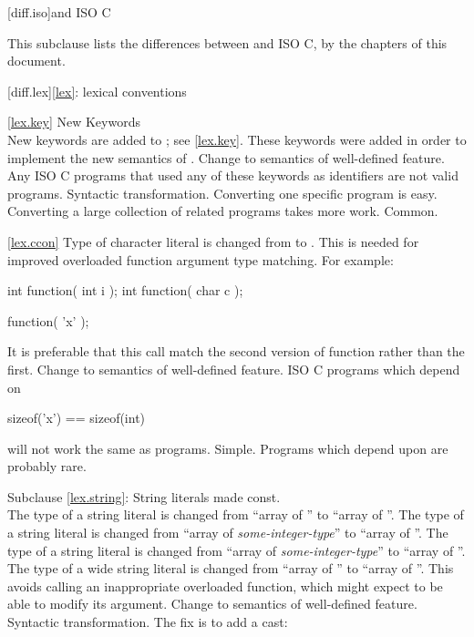 
[diff.iso]{\Cpp and ISO C}

\pnum
{}%
This subclause lists the differences between \Cpp and
ISO C, by the chapters of this document.

[diff.lex]{\ref{lex}: lexical conventions}

\ref{lex.key}
\change New Keywords\\
New keywords are added to \Cpp;
see \ref{lex.key}.
\rationale
These keywords were added in order to implement the new
semantics of \Cpp.
\effect
Change to semantics of well-defined feature.
Any ISO C programs that used any of these keywords as identifiers
are not valid \Cpp programs.
\difficulty
Syntactic transformation.
Converting one specific program is easy.
Converting a large collection
of related programs takes more work.
\howwide
Common.

\ref{lex.ccon}
\change Type of character literal is changed from  to .
\rationale
This is needed for improved overloaded function argument type
matching.
For example:

\begin{codeblock}
int function( int i );
int function( char c );

function( 'x' );
\end{codeblock}

It is preferable that this call match the second version of
function rather than the first.
\effect
Change to semantics of well-defined feature.
ISO C programs which depend on

\begin{codeblock}
sizeof('x') == sizeof(int)
\end{codeblock}

will not work the same as \Cpp programs.
\difficulty
Simple.
\howwide
Programs which depend upon  are probably rare.

Subclause \ref{lex.string}:
\change String literals made const.\\
The type of a string literal is changed
from ``array of ''
to ``array of ''.
The type of a  string literal is changed
from ``array of \textit{some-integer-type}''
to ``array of ''.
The type of a  string literal is changed
from ``array of \textit{some-integer-type}''
to ``array of ''.
The type of a wide string literal is changed
from ``array of ''
to ``array of ''.
\rationale
This avoids calling an inappropriate overloaded function,
which might expect to be able to modify its argument.
\effect
Change to semantics of well-defined feature.
\difficulty
Syntactic transformation. The fix is to add a cast:

